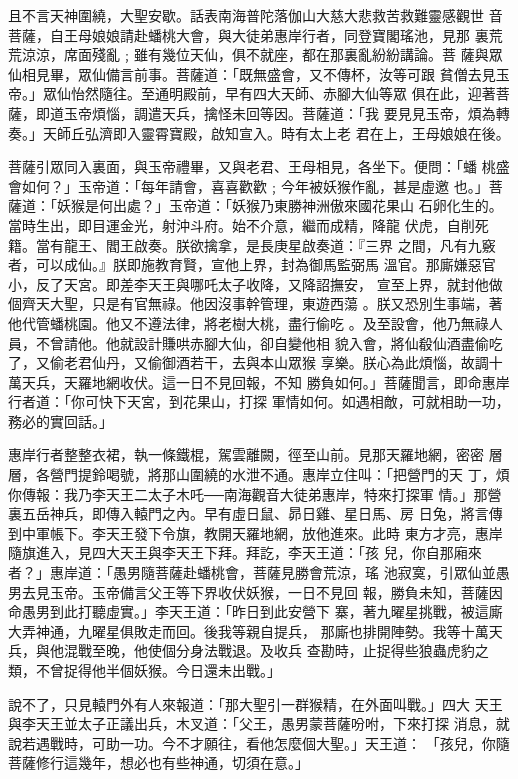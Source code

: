 \begin{pinyinscope}
{且不言天神圍繞，大聖安歇。話表南海普陀落伽山大慈大悲救苦救難靈感觀世
音菩薩，自王母娘娘請赴蟠桃大會，與大徒弟惠岸行者，同登寶閣瑤池，見那
裏荒荒涼涼，席面殘亂﹔雖有幾位天仙，俱不就座，都在那裏亂紛紛講論。菩
薩與眾仙相見畢，眾仙備言前事。菩薩道：「既無盛會，又不傳杯，汝等可跟
貧僧去見玉帝。」眾仙怡然隨往。至通明殿前，早有四大天師、赤腳大仙等眾
俱在此，迎著菩薩，即道玉帝煩惱，調遣天兵，擒怪未回等因。菩薩道：「我
要見見玉帝，煩為轉奏。」天師丘弘濟即入靈霄寶殿，啟知宣入。時有太上老
君在上，王母娘娘在後。

菩薩引眾同入裏面，與玉帝禮畢，又與老君、王母相見，各坐下。便問：「蟠
桃盛會如何？」玉帝道：「每年請會，喜喜歡歡﹔今年被妖猴作亂，甚是虛邀
也。」菩薩道：「妖猴是何出處？」玉帝道：「妖猴乃東勝神洲傲來國花果山
石卵化生的。當時生出，即目運金光，射沖斗府。始不介意，繼而成精，降龍
伏虎，自削死籍。當有龍王、閻王啟奏。朕欲擒拿，是長庚星啟奏道：『三界
之間，凡有九竅者，可以成仙。』朕即施教育賢，宣他上界，封為御馬監弼馬
溫官。那廝嫌惡官小，反了天宮。即差李天王與哪吒太子收降，又降詔撫安，
宣至上界，就封他做個齊天大聖，只是有官無祿。他因沒事幹管理，東遊西蕩
。朕又恐別生事端，著他代管蟠桃園。他又不遵法律，將老樹大桃，盡行偷吃
。及至設會，他乃無祿人員，不曾請他。他就設計賺哄赤腳大仙，卻自變他相
貌入會，將仙殽仙酒盡偷吃了，又偷老君仙丹，又偷御酒若干，去與本山眾猴
享樂。朕心為此煩惱，故調十萬天兵，天羅地網收伏。這一日不見回報，不知
勝負如何。」菩薩聞言，即命惠岸行者道：「你可快下天宮，到花果山，打探
軍情如何。如遇相敵，可就相助一功，務必的實回話。」

惠岸行者整整衣裙，執一條鐵棍，駕雲離闕，徑至山前。見那天羅地網，密密
層層，各營門提鈴喝號，將那山圍繞的水泄不通。惠岸立住叫：「把營門的天
丁，煩你傳報：我乃李天王二太子木吒──南海觀音大徒弟惠岸，特來打探軍
情。」那營裏五岳神兵，即傳入轅門之內。早有虛日鼠、昴日雞、星日馬、房
日兔，將言傳到中軍帳下。李天王發下令旗，教開天羅地網，放他進來。此時
東方才亮，惠岸隨旗進入，見四大天王與李天王下拜。拜訖，李天王道：「孩
兒，你自那廂來者？」惠岸道：「愚男隨菩薩赴蟠桃會，菩薩見勝會荒涼，瑤
池寂寞，引眾仙並愚男去見玉帝。玉帝備言父王等下界收伏妖猴，一日不見回
報，勝負未知，菩薩因命愚男到此打聽虛實。」李天王道：「昨日到此安營下
寨，著九曜星挑戰，被這廝大弄神通，九曜星俱敗走而回。後我等親自提兵，
那廝也排開陣勢。我等十萬天兵，與他混戰至晚，他使個分身法戰退。及收兵
查勘時，止捉得些狼蟲虎豹之類，不曾捉得他半個妖猴。今日還未出戰。」

說不了，只見轅門外有人來報道：「那大聖引一群猴精，在外面叫戰。」四大
天王與李天王並太子正議出兵，木叉道：「父王，愚男蒙菩薩吩咐，下來打探
消息，就說若遇戰時，可助一功。今不才願往，看他怎麼個大聖。」天王道：
「孩兒，你隨菩薩修行這幾年，想必也有些神通，切須在意。」

}
\end{pinyinscope}
